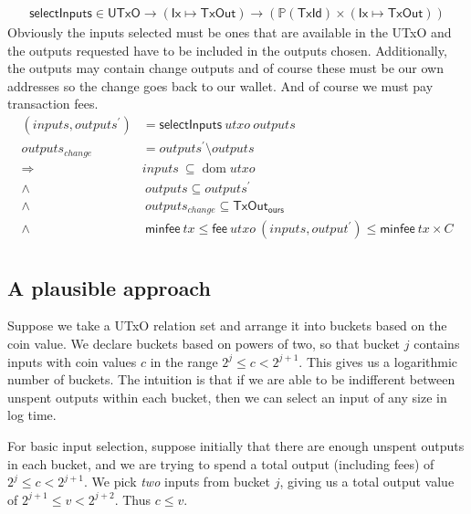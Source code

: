 \documentclass{article}
\newcommand{\powerset}[1]{\mathbb{P}(#1)}
\DeclareMathOperator{\dom}{dom}
\begin{document}
\begin{equation}
\begin{split}
\mathsf{selectInputs} \in \mathsf{UTxO} \to (\mathsf{Ix} \mapsto \mathsf{TxOut})
                      \to (\powerset{\mathsf{TxId}} \times (\mathsf{Ix} \mapsto \mathsf{TxOut}))
\end{split}
\end{equation}
Obviously the inputs selected must be ones that are available in the UTxO and
the outputs requested have to be included in the outputs chosen. Additionally,
the outputs may contain change outputs and of course these must be our own
addresses so the change goes back to our wallet. And of course we must pay
transaction fees.
\begin{equation}
\begin{split}
(inputs, outputs^\prime) & = \mathsf{selectInputs} ~ utxo ~ outputs \\
outputs_{change} & = outputs^\prime \setminus outputs \\
 \Longrightarrow \quad & inputs ~ \subseteq \dom utxo \\
\wedge & ~ outputs \subseteq outputs^\prime \\
\wedge & ~ outputs_{change} \subseteq \mathsf{TxOut_{ours}} \\
\wedge & ~ \mathsf{minfee} ~ tx \leq \mathsf{fee} ~ utxo ~ (inputs, output^\prime) \leq \mathsf{minfee} ~ tx \times C\\
\end{split}
\end{equation}

\subsection{A plausible approach}

Suppose we take a UTxO relation set and arrange it into buckets based on the
coin value. We declare buckets based on powers of two, so that bucket $j$
contains inputs with coin values $c$ in the range $2^j \leq c < 2^{j+1}$. This
gives us a logarithmic number of buckets. The intuition is that if we are able
to be indifferent between unspent outputs within each bucket, then we can
select an input of any size in log time.

For basic input selection, suppose initially that there are enough unspent
outputs in each bucket, and we are trying to spend a total output (including
fees) of $2^j \leq c < 2^{j+1}$. We pick \emph{two} inputs from bucket $j$,
giving us a total output value of $2^{j+1} \leq v < 2^{j+2}$. Thus $c \leq v$.
\end{document}
